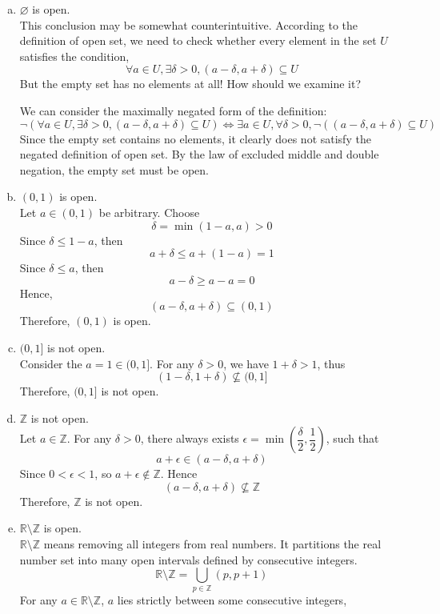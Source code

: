 \begin{mysolution}
    \begin{enumerate}[(a)]
    \item $\varnothing$ is open.\\
    This conclusion may be somewhat counterintuitive. According to the definition of open set, we need to check whether every element in the set $U$ satisfies the condition, 
    \[\forall a \in U, \exists \delta > 0, (a-\delta, a+\delta) \subseteq U\]
    But the empty set has no elements at all! How should we examine it?

    We can consider the maximally negated form of the definition:
    \[\neg\left(\forall a \in U, \exists \delta > 0, (a-\delta, a+\delta) \subseteq U \right) \iff \exists a \in U, \forall \delta>0, \neg\left((a-\delta, a+\delta) \subseteq U\right)\]
    Since the empty set contains no elements, it clearly does not satisfy the negated definition of open set. By the law of excluded middle and double negation, the empty set must be open.
    \item $(0,1)$ is open.\\
    Let $a \in (0,1)$ be arbitrary. Choose
    \[\delta = \min(1-a, a)>0\]
    Since $\delta \le 1-a$, then 
    \[a+\delta \le a+(1-a)=1\]
    Since $\delta \le a$, then 
    \[a-\delta \ge a-a = 0\]
    Hence, 
    \[(a-\delta, a+\delta) \subseteq (0, 1)\]
    Therefore, $(0,1)$ is open.
    \item $(0,1]$ is not open.\\
    Consider the $a=1 \in (0,1]$. For any $\delta > 0$, we have $1+\delta > 1$, thus
    \[(1-\delta, 1+\delta) \nsubseteq (0,1]\]
    Therefore, $(0,1]$ is not open.
    \item $\mathbb{Z}$ is not open.\\
    Let $a \in \mathbb{Z}$. For any $\delta > 0$, there always exists $\epsilon = \min\left(\dfrac{\delta}{2}, \dfrac{1}{2}\right)$, such that
    \[a+\epsilon \in (a-\delta, a+\delta)\]
    Since $0 < \epsilon < 1$, so $a+\epsilon \notin \mathbb{Z}$. Hence
    \[(a-\delta, a+\delta) \nsubseteq \mathbb{Z}\]
    Therefore, $\mathbb{Z}$ is not open.
    \item $\mathbb{R} \setminus \mathbb{Z}$ is open.\\
    $\mathbb{R}\setminus\mathbb{Z}$ means removing all integers from real numbers. It partitions the real number set into many open intervals defined by consecutive integers. 
    \[\mathbb{R}\setminus\mathbb{Z} = \bigcup_{p \in \mathbb{Z}} (p, p+1)\]
    For any $a \in \mathbb{R}\setminus\mathbb{Z}$, $a$ lies strictly between some consecutive integers,

\end{enumerate}
\end{mysolution}
